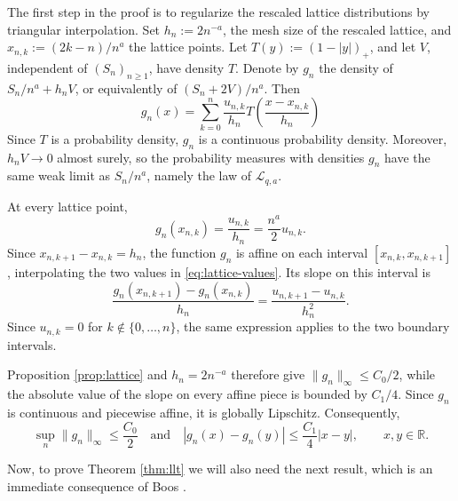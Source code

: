 \documentclass[11pt]{article}
\numberwithin{equation}{section}
\theoremstyle{remark}
\newcommand{\R}{\mathbb{R}}
\begin{document}
\smallskip

The first step in the proof is to regularize the rescaled lattice
distributions by triangular interpolation. Set $h_n:=2n^{-a}$, the
mesh size of the rescaled lattice, and
$x_{n,k}:=(2k-n)/n^a$ the lattice points. Let $T(y):=(1-|y|)_+$, and let $V$, independent
of $(S_n)_{n\geq1}$, have density $T$. Denote by $g_n$ the density of
$S_n/n^a+h_nV$, or equivalently of $(S_n+2V)/n^a$. Then
\begin{equation}\label{eq:interpolation}
 g_n(x)=\sum_{k=0}^n\frac{u_{n,k}}{h_n}
 T\!\left(\frac{x-x_{n,k}}{h_n}\right)
\end{equation}
Since $T$ is a probability density, $g_n$ is a continuous probability
density. Moreover, $h_nV\to0$ almost surely, so the probability
measures with densities $g_n$ have the same weak limit as
$S_n/n^a$, namely the law of $\mathcal{L}_{q,a}$.

At every lattice point,
\begin{equation}\label{eq:lattice-values}
 g_n(x_{n,k})=\frac{u_{n,k}}{h_n}=\frac{n^a}{2}u_{n,k}.
\end{equation}
Since $x_{n,k+1}-x_{n,k}=h_n$, the function $g_n$ is affine on
each interval $[x_{n,k},x_{n,k+1}]$, interpolating the two values in
\eqref{eq:lattice-values}. Its slope on this interval is
\[
 \frac{g_n(x_{n,k+1})-g_n(x_{n,k})}{h_n}
 =\frac{u_{n,k+1}-u_{n,k}}{h_n^2}.
\]
Since $u_{n,k}=0$ for
$k\notin\{0,\ldots,n\}$, the same expression applies to the two boundary intervals.

Proposition \ref{prop:lattice} and $h_n=2n^{-a}$ therefore give
$\|g_n\|_\infty\leq C_0/2$, while the absolute value of the slope on
every affine piece is bounded by $C_1/4$. Since $g_n$ is continuous
and piecewise affine, it is globally Lipschitz. Consequently,
\begin{equation}\label{eq:equi}
\sup_n\|g_n\|_\infty\leq\frac{C_0}{2} \quad \textrm{and}
\quad
|g_n(x)-g_n(y)|
\leq\frac{C_1}{4}|x-y|,
\qquad x,y\in\mathbb{R}.
\end{equation}

Now, to prove Theorem \ref{thm:llt} we will also need the next result, which is an immediate consequence of Boos
\cite[Lemma 1]{boos}.
\end{document}
